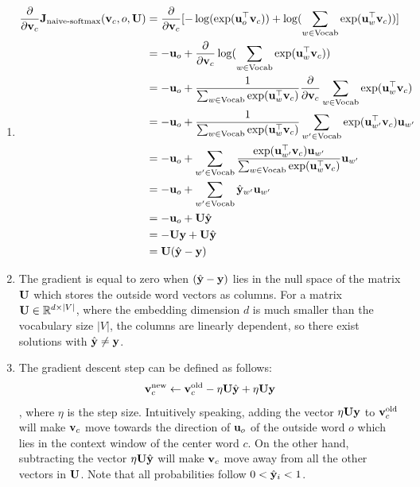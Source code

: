 \begin{parts}
{\begin{enumerate}[label=\roman*.]
    \item 
    \begin{align}
    \frac{\partial}{\partial \mathbf{v}_c} \mathbf{J}_{\text{naive-softmax}}(\mathbf{v}_c, o, \mathbf{U})
    &= \frac{\partial}{\partial \mathbf{v}_c} [-\log(\exp(\mathbf{u}_{o}^\top \mathbf{v}_c)) + \log(\sum_{w \in \text{Vocab}} \exp(\mathbf{u}_{w}^\top \mathbf{v}_c))] \\
    &= -\mathbf{u}_o + \frac{\partial}{\partial \mathbf{v}_c} \log(\sum_{w \in \text{Vocab}} \exp(\mathbf{u}_{w}^\top \mathbf{v}_c)) \\
    &= -\mathbf{u}_o + \frac{1}{\sum_{w \in \text{Vocab}} \exp(\mathbf{u}_{w}^\top \mathbf{v}_c)} \frac{\partial}{\partial \mathbf{v}_c} \sum_{w \in \text{Vocab}} \exp(\mathbf{u}_{w}^\top \mathbf{v}_c) \\
    &= -\mathbf{u}_o + \frac{1}{\sum_{w \in \text{Vocab}} \exp(\mathbf{u}_{w}^\top \mathbf{v}_c)} \sum_{w' \in \text{Vocab}} \exp(\mathbf{u}_{w'}^\top \mathbf{v}_c)\mathbf{u}_{w'} \\
    &= -\mathbf{u}_o + \sum_{w' \in \text{Vocab}} \frac{\exp(\mathbf{u}_{w'}^\top \mathbf{v}_c)\mathbf{u}_{w'}}{\sum_{w \in \text{Vocab}} \exp(\mathbf{u}_{w}^\top \mathbf{v}_c)} \mathbf{u}_{w'} \\
    &= -\mathbf{u}_o + \sum_{w' \in \text{Vocab}} \hat{\mathbf{y}}_{w'} \mathbf{u}_{w'} \\
    &= -\mathbf{u}_o + \mathbf{U}\hat{\mathbf{y}} \\
    &= -\mathbf{U}\mathbf{y} + \mathbf{U}\hat{\mathbf{y}} \\
    &= \mathbf{U}(\hat{\mathbf{y}} - \mathbf{y})
    \end{align}

    \item
    The gradient is equal to zero when $(\hat{\mathbf{y}} - \mathbf{y})$ lies in the null space of the matrix $\mathbf{U}$ which stores the outside word vectors as columns. For a matrix $\mathbf{U} \in \mathbb{R}^{d \times |V|}$, where the embedding dimension $d$ is much smaller than the vocabulary size $|V|$, the columns are linearly dependent, so there exist solutions with $\hat{\mathbf{y}} \ne \mathbf{y}$.
    
    \item
    The gradient descent step can be defined as follows:
    $$
        \mathbf{v}_c^{\text{new}} \gets \mathbf{v}_c^{\text{old}} - \eta \mathbf{U}\hat{\mathbf{y}} + \eta \mathbf{U}\mathbf{y}
    $$
    , where $\eta$ is the step size. Intuitively speaking, adding the vector $\eta \mathbf{U}\mathbf{y}$ to $\mathbf{v}_c^{\text{old}}$ will make $\mathbf{v}_c$ move towards the direction of $\mathbf{u}_o$ of the outside word $o$ which lies in the context window of the center word $c$. On the other hand, subtracting the vector $\eta \mathbf{U}\hat{\mathbf{y}}$ will make $\mathbf{v}_c$ move away from all the other vectors in $\mathbf{U}$. Note that all probabilities follow $0 < \hat{\mathbf{y}}_i < 1$.


\end{enumerate}}
\end{parts}
